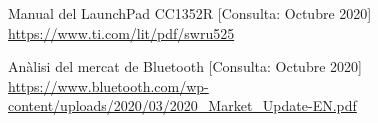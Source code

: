 \begin{thebibliography}{2}
Manual del LaunchPad CC1352R
[Consulta: Octubre 2020] \newline
\href{https://www.ti.com/lit/pdf/swru525}{https://www.ti.com/lit/pdf/swru525}

Anàlisi del mercat de Bluetooth
[Consulta: Octubre 2020] \newline
\href{https://www.bluetooth.com/wp-content/uploads/2020/03/2020\_Market\_Update-EN.pdf}{https://www.bluetooth.com/wp-content/uploads/2020/03/2020\_Market\_Update-EN.pdf}

\end{thebibliography}